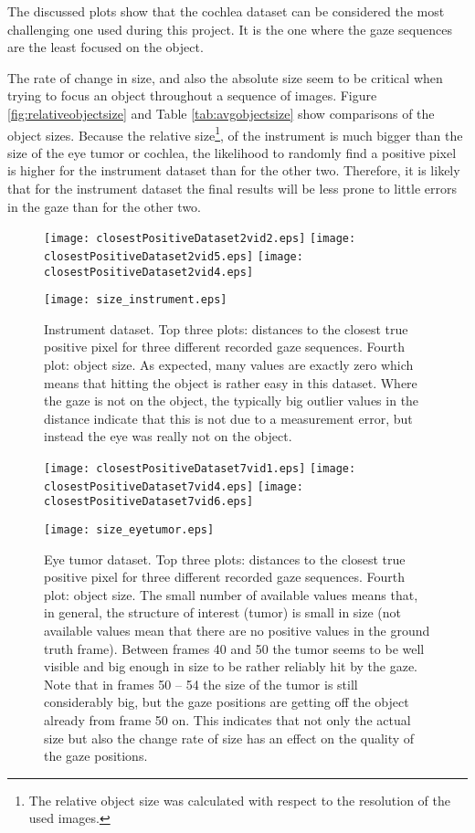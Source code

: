 The discussed plots show that the cochlea dataset can be considered the most challenging one used during this project. 
It is the one where the gaze sequences are the least focused on the object. 

The rate of change in size, and also the absolute size seem to be critical when trying to focus an object throughout a sequence of images. 
Figure \ref{fig:relativeobjectsize} and Table \ref{tab:avgobjectsize} show comparisons of the object sizes. 
Because the relative size\footnote{The relative object size was calculated with respect to the resolution of the used images.}, of the instrument is much bigger than the size of the eye tumor or cochlea, the likelihood to randomly find a positive pixel is higher for the instrument dataset than for the other two. Therefore, it is likely that for the instrument dataset the final results will be less prone to little errors in the gaze than for the other two. 
\begin{figure}[ht]
	  \texttt{[image: closestPositiveDataset2vid2.eps]}
	  \texttt{[image: closestPositiveDataset2vid5.eps]}
	  \texttt{[image: closestPositiveDataset2vid4.eps]}
	  
	  \vspace{3mm}
	  \texttt{[image: size\_instrument.eps]}
	  \caption{Instrument dataset. Top three plots: distances to the closest true positive pixel for three different recorded gaze sequences. Fourth plot: object size. As expected, many values are exactly zero which means that hitting the object is rather easy in this dataset. Where the gaze is not on the object, the typically big outlier values in the distance indicate that this is not due to a measurement error, but instead the eye was really not on the object.}
	\label{fig:distanceToClosestPositiveD2}
\end{figure}

\begin{figure}[ht]
	  \texttt{[image: closestPositiveDataset7vid1.eps]}
	  \texttt{[image: closestPositiveDataset7vid4.eps]}
	  \texttt{[image: closestPositiveDataset7vid6.eps]}
	  
	  \vspace{3mm}
	  \texttt{[image: size\_eyetumor.eps]}	  
	  \caption{Eye tumor dataset. Top three plots: distances to the closest true positive pixel for three different recorded gaze sequences. Fourth plot: object size. The small number of available values means that, in general, the structure of interest (tumor) is small in size (not available values mean that there are no positive values in the ground truth frame). Between frames 40 and 50 the tumor seems to be well visible and big enough in size to be rather reliably hit by the gaze. Note that in frames 50 -- 54 the size of the tumor is still considerably big, but the gaze positions are getting off the object already from frame 50 on. This indicates that not only the actual size but also the change rate of size has an effect on the quality of the gaze positions.}
	\label{fig:distanceToClosestPositiveD7}
\end{figure}

